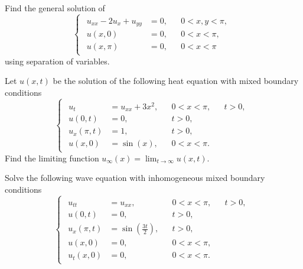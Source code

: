 \documentclass[plain]{pset}
\begin{document}
\pagebreak

\begin{problem}
Find the general solution of
\[
    \begin{cases}
        \begin{aligned}
            u_{xx} - 2u_x + u_{yy} & = 0, &  & 0 < x, y < \pi, \\
            u(x, 0)                & = 0, &  & 0 < x < \pi,    \\
            u(x, \pi)              & = 0, &  & 0 < x < \pi
        \end{aligned}
    \end{cases}
\]
using separation of variables.
\end{problem}

\begin{solution}

\end{solution}

\pagebreak

\begin{problem}
Let \(u(x, t)\) be the solution of the following heat equation with mixed boundary conditions
\[
    \begin{cases}
        \begin{aligned}
            u_t         & = u_{xx} + 3x^2, &  & 0 < x < \pi, &  & t > 0, \\
            u(0, t)     & = 0,             &  & t > 0,                   \\
            u_x(\pi, t) & = 1,             &  & t > 0,                   \\
            u(x, 0)     & = \sin(x),       &  & 0 < x < \pi.
        \end{aligned}
    \end{cases}
\]
Find the limiting function \(u_\infty(x) = \lim_{t \to \infty} u(x, t)\).
\end{problem}

\begin{solution}

\end{solution}

\pagebreak

\begin{problem}
Solve the following wave equation with inhomogeneous mixed boundary conditions
\[
    \begin{cases}
        \begin{aligned}
            u_{tt}      & = u_{xx},                        &  & 0 < x < \pi, &  & t > 0, \\
            u(0, t)     & = 0,                             &  & t > 0,                   \\
            u_x(\pi, t) & = \sin\left(\frac{3t}{2}\right), &  & t > 0,                   \\
            u(x, 0)     & = 0,                             &  & 0 < x < \pi,             \\
            u_t(x, 0)   & = 0,                             &  & 0 < x < \pi.
        \end{aligned}
    \end{cases}
\]
\end{problem}

\begin{solution}

\end{solution}
\end{document}
